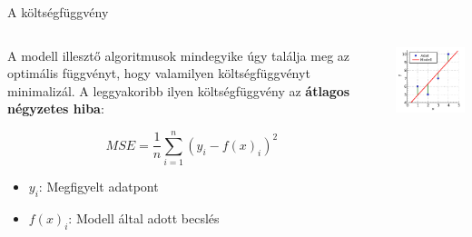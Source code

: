 \documentclass[english, aspectratio=169]{beamer}
\begin{document}
\begin{frame}{A költségfüggvény}
	\begin{columns}
		\begin{column}{.5\textwidth}
			A modell illesztő algoritmusok mindegyike úgy találja meg az optimális függvényt, hogy valamilyen költségfüggvényt minimalizál. A leggyakoribb ilyen költségfüggvény az \textbf{átlagos négyzetes hiba}:
			\begin{block}{}
				\[
				MSE = \frac{1}{n} \sum_{i=1}^n \left( y_i - f(x)_i \right)^2
				\]
				\begin{itemize}
					\item $y_i$: Megfigyelt adatpont
					\item $f(x)_i$: Modell által adott becslés
				\end{itemize}
			\end{block}
		\end{column}
		\begin{column}{.5\textwidth}
			\begin{center}
				\includegraphics[width=6cm, keepaspectratio]{images/ql_11.png}
			\end{center}
		\end{column}
	\end{columns}
\end{frame}
\end{document}
